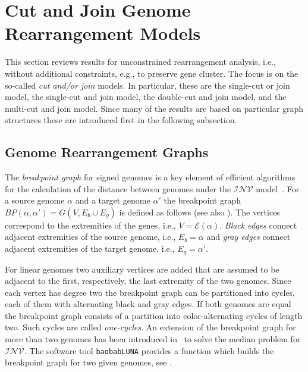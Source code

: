 \documentclass{svmult}
\newcommand{\m}[1]{\mathcal{#1}}
\begin{document}
\section{Cut and Join Genome Rearrangement Models}
\label{sec:x-cut}
%
This section reviews results for unconstrained rearrangement analysis, i.e., 
without additional constraints, e.g., to preserve gene cluster. The focus is on the so-called \emph{cut and/or join} models. 
In particular, these are the single-cut or join model, the single-cut and join model, the double-cut and join model, and the multi-cut 
and join model.
%
Since many of the results are based on particular graph structures these are 
introduced first in the following subsection.

\subsection{Genome Rearrangement Graphs}

The \emph{breakpoint graph} for signed genomes is a key element of efficient
algorithms for the calculation of the distance between genomes under the
$\m{INV}$ model~\cite{Hannenhalli_1999}.
%
For a source genome $\alpha$ and a target genome $\alpha'$ the breakpoint graph
$BP(\alpha,\alpha') = G(V,E_b \cup E_g)$ is defined as follows (see also 
). The vertices correspond to the
extremities of the genes, i.e., $V=\m{E}(\alpha)$. \emph{Black edges} connect
adjacent extremities of the source genome, i.e., $E_b=\alpha$ and \emph{gray edges} connect adjacent extremities of the target
genome, i.e., $E_g=\alpha'$.


%
For linear genomes two auxiliary vertices are added that are assumed to be
adjacent to the first, respectively, the last extremity of the two genomes.
Since each vertex has degree two the breakpoint graph can be 
partitioned into cycles, each of them with alternating black and gray edges. 
%
If both genomes are equal the breakpoint graph consists of a partition into color-alternating cycles of length two. 
Such cycles are called \emph{one-cycles}.
%
An extension of the breakpoint graph for more than two genomes has been
introduced in~\cite{Caprara_2003} to solve the median problem for $\m{INV}$.
%
The software tool \texttt{baobabLUNA} provides a function which builds the
breakpoint graph for two given genomes, see .
\end{document}
